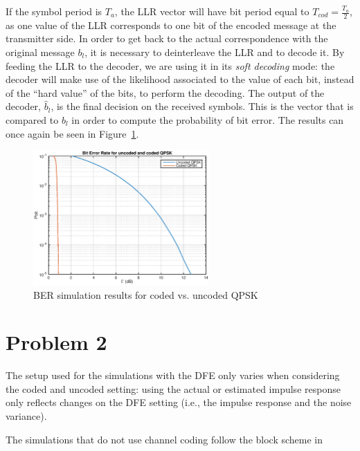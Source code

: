 \documentclass[10pt]{article}
\begin{document}
If the symbol period is $T_a$, the LLR vector will have bit period equal to $T_{cod} = \frac{T_a}{2}$, as one value of the LLR corresponds to one bit of the encoded message at the transmitter side. In order to get back to the actual correspondence with the original message $b_l$, it is necessary to deinterleave the LLR and to decode it. By feeding the LLR to the decoder, we are using it in its \emph{soft decoding} mode: the decoder will make use of the likelihood associated to the value of each bit, instead of the ``hard value'' of the bits, to perform the decoding. %
The output of the decoder, $\hat{b}_l$, is the final decision on the received symbols. This is the vector that is compared to $b_l$ in order to compute the probability of bit error. The results can once again be seen in Figure~\ref{fig:problem1_pbit}. 

\begin{figure}
	\centering
	\includegraphics[width = 0.6\textwidth]{problem1}
	\caption{BER simulation results for coded vs. uncoded QPSK}
	\label{fig:problem1_pbit}
\end{figure}




\section*{Problem 2}
The setup used for the simulations with the DFE only varies when considering the coded and uncoded setting: using the actual or estimated impulse response only reflects changes on the DFE setting (i.e., the impulse response and the noise variance). 

The simulations that do not use channel coding follow the block scheme in %
\end{document}
